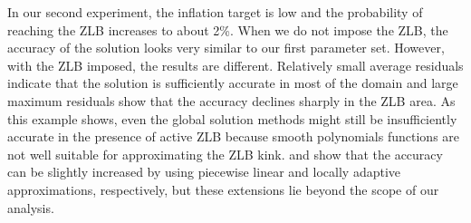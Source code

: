 In our second experiment, the inflation target is low and the probability of reaching the ZLB
increases to about 2\%. When we do not impose the ZLB, the accuracy of the solution looks very
similar to our first parameter set. However, with the ZLB imposed, the results are different.
Relatively small average residuals indicate that the solution is sufficiently accurate in most of
the domain and large maximum residuals show that the accuracy declines sharply in the ZLB area. As
this example shows, even the global solution methods might still be insufficiently accurate in the
presence of active ZLB because smooth polynomials functions are not well suitable for approximating
the ZLB kink. \cite{ACS2017} and \cite{MM2015} show that the accuracy can be slightly increased by
using piecewise linear and locally adaptive approximations, respectively, but these extensions lie
beyond the scope of our analysis.
